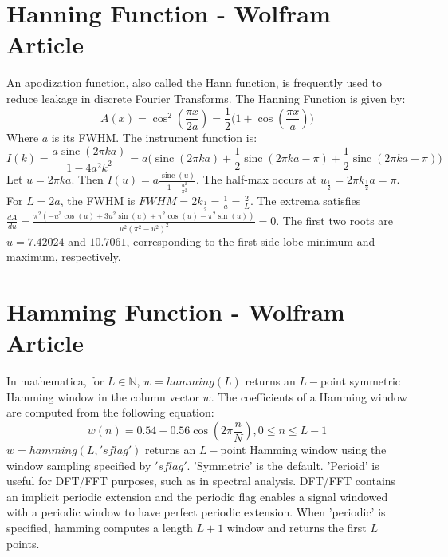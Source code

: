 \documentclass[oneside]{book}
\theoremstyle{mystyle}
\DeclareMathOperator{\sinc}{sinc}
\begin{document}
\section{Hanning Function - Wolfram Article}
An apodization function, also called the Hann function, is frequently used to reduce leakage in discrete Fourier Transforms. The Hanning Function is given by:
\begin{equation}
A(x) = \cos^{2}(\frac{\pi x}{2a}) = \frac{1}{2}\big(1+\cos(\frac{\pi x}{a})\big)
\end{equation}
\noindent Where $a$ is its FWHM. The instrument function is:
\begin{equation}
I(k) = \frac{a\sinc(2\pi k a)}{1-4a^2 k^2} = a\big(\sinc(2\pi k a)+ \frac{1}{2}\sinc(2\pi k a-\pi)+\frac{1}{2}\sinc(2\pi k a + \pi)\big)
\end{equation}
\noindent Let $u = 2\pi k a$. Then $I(u) = a\frac{\sinc(u)}{1-\frac{u^2}{\pi^2}}$. The half-max occurs at $u_{\frac{1}{2}} = 2\pi k_{\frac{1}{2}}a = \pi$. For $L = 2a$, the FWHM is $FWHM = 2k_{\frac{1}{2}} = \frac{1}{a} = \frac{2}{L}$. The extrema satisfies $\frac{dA}{du} = \frac{\pi^2(-u^3\cos(u)+3u^2\sin(u)+\pi^2\cos(u)-\pi^2\sin(u))}{u^2(\pi^2-u^2)^2} = 0$. The first two roots are $u=7.42024$ and $10.7061$, corresponding to the first side lobe minimum and maximum, respectively. 
\section{Hamming Function - Wolfram Article}
\noindent In mathematica, for $L\in \mathbb{N}$, $w = hamming(L)$ returns an $L-$point symmetric Hamming window in the column vector $w$. The coefficients of a Hamming window are computed from the following equation:
\begin{equation}
w(n) = 0.54-0.56\cos(2\pi \frac{n}{N}), 0\leq n \leq L-1
\end{equation}
\noindent $w=hamming(L,'sflag')$ returns an $L-$point Hamming window using the window sampling specified by $'sflag'$. 'Symmetric' is the default. 'Perioid' is useful for DFT/FFT purposes, such as in spectral analysis. DFT/FFT contains an implicit periodic extension and the periodic flag enables a signal windowed with a periodic window to have perfect periodic extension. When 'periodic' is specified, hamming computes a length $L+1$ window and returns the first $L$ points. 
\end{document}
